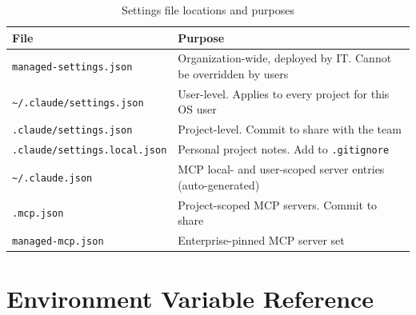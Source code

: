 \begin{table}[ht]
\centering
\caption{Settings file locations and purposes}
\label{tab:app-settings}
\begin{tabularx}{\textwidth}{lX}
\toprule
\textbf{File} & \textbf{Purpose} \\
\midrule
\texttt{managed-settings.json}                   & Organization-wide, deployed by IT. Cannot be overridden by users \\
\texttt{\textasciitilde/.claude/settings.json}   & User-level. Applies to every project for this OS user \\
\texttt{.claude/settings.json}                   & Project-level. Commit to share with the team \\
\texttt{.claude/settings.local.json}             & Personal project notes. Add to \texttt{.gitignore} \\
\texttt{\textasciitilde/.claude.json}            & MCP local- and user-scoped server entries (auto-generated) \\
\texttt{.mcp.json}                               & Project-scoped MCP servers. Commit to share \\
\texttt{managed-mcp.json}                        & Enterprise-pinned MCP server set \\
\bottomrule
\end{tabularx}
\end{table}

\section{Environment Variable Reference}
\label{app:env-vars}

